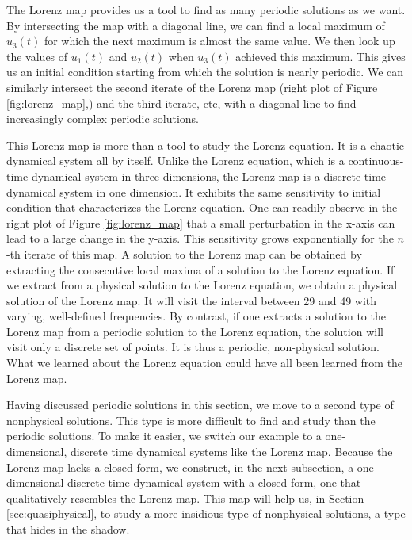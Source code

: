 The Lorenz map provides us a tool to find as many periodic solutions as we want.
By intersecting the map with a diagonal line, we can find a local maximum of $u_3(t)$
for which the next maximum is almost the same value.  We then look up the values of
$u_1(t)$ and $u_2(t)$ when $u_3(t)$ achieved this maximum.  This gives us an initial
condition starting from which the solution is nearly periodic.   We can similarly
intersect the second iterate of the Lorenz map (right plot of Figure \ref{fig:lorenz_map},)
and the third iterate, etc, with a diagonal line to find increasingly
complex periodic solutions. 

This Lorenz map is more than a tool to study the Lorenz equation.  It is a chaotic
dynamical system all by itself. Unlike the Lorenz equation, which is a continuous-time
dynamical system in three dimensions, the Lorenz map is a discrete-time dynamical
system in one dimension.  It exhibits the same sensitivity to initial condition
that characterizes the Lorenz equation.  One can readily observe in the right
plot of Figure \ref{fig:lorenz_map} that a small perturbation in the x-axis
can lead to a large change in the y-axis. This sensitivity grows exponentially
for the $n$-th iterate of this map. A solution to the Lorenz map can be obtained
by extracting the consecutive local maxima of a solution to the Lorenz equation.
If we extract from a physical solution to the Lorenz equation, we obtain a physical solution of the Lorenz map.  It will visit the
interval between 29 and 49 with varying, well-defined frequencies.
By contrast, if one extracts a solution to the Lorenz map from a periodic solution
to the Lorenz equation, the solution will visit only a discrete set of points.
It is thus a periodic, non-physical solution.  What we learned about
the Lorenz equation could have all been learned from the Lorenz map.

Having discussed periodic solutions in this section,
we move to a second type of nonphysical solutions.
This type is more difficult to find and study than the periodic solutions.
To make it easier, we switch our example to a one-dimensional, discrete time dynamical
systems like the Lorenz map.  Because the Lorenz map lacks a closed form,
we construct, in the next subsection, a one-dimensional discrete-time dynamical system
with a closed form, one that qualitatively resembles the Lorenz map.  This map
will help us, in Section \ref{sec:quasiphysical}, to study a more insidious type
of nonphysical solutions, a type that hides in the shadow.

